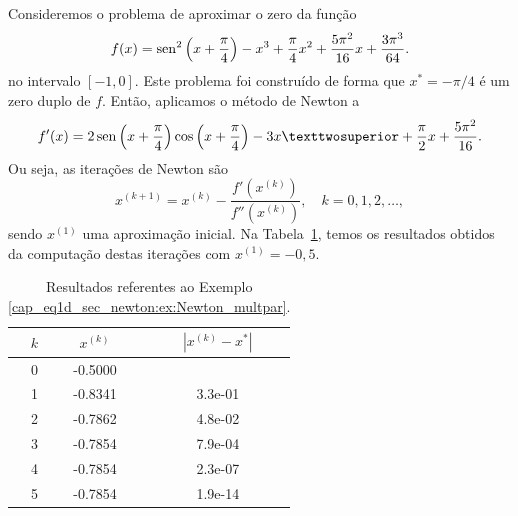 \begin{ex}\label{ex:Newton_multpar}
  Consideremos o problema de aproximar o zero da função
  \begin{equation}\label{cap_eq1d_sec_newton:eq:funex}
    f(x) = \operatorname{sen}^2\left(x+\frac{\pi}{4}\right) - x^3 + \frac{\pi}{4}x^2 + \frac{5\pi^2}{16}x + \frac{3\pi^3}{64}.
  \end{equation}
  no intervalo $[-1,0]$. Este problema foi construído de forma que $x^* = -\pi/4$ é um zero duplo de $f$. Então, aplicamos o método de Newton a
  \begin{equation}
    f'(x) = 2\sen\left(x+\frac{\pi}{4}\right)\cos\left(x+\frac{\pi}{4}\right) -3x² +\frac{\pi}{2}x+\frac{5\pi^2}{16}.
  \end{equation}
Ou seja, as iterações de Newton são
\begin{equation}
  x^{(k+1)} = x^{(k)} - \frac{f'(x^{(k)})}{f''(x^{(k)})},\quad k=0, 1, 2, \ldots,
\end{equation}
sendo $x^{(1)}$ uma aproximação inicial. Na Tabela~\ref{cap_eq1d_sec_newton:tab:ex_Newton_multpar}, temos os resultados obtidos da computação destas iterações com $x^{(1)}=-0,5$.

\begin{table}[h!]
  \centering
  \caption{Resultados referentes ao Exemplo \ref{cap_eq1d_sec_newton:ex:Newton_multpar}.}
  \label{cap_eq1d_sec_newton:tab:ex_Newton_multpar}
  \begin{tabular}{r|cc}
    $k$ & $x^{(k)}$ & $|x^{(k)}-x^*|$ \\\hline
    0 & -0.5000 & \\
    1 & -0.8341 & 3.3e-01\\
    2 & -0.7862 & 4.8e-02\\
    3 & -0.7854 & 7.9e-04\\
    4 & -0.7854 & 2.3e-07\\
    5 & -0.7854 & 1.9e-14\\\hline
  \end{tabular}
\end{table}

\end{ex}


